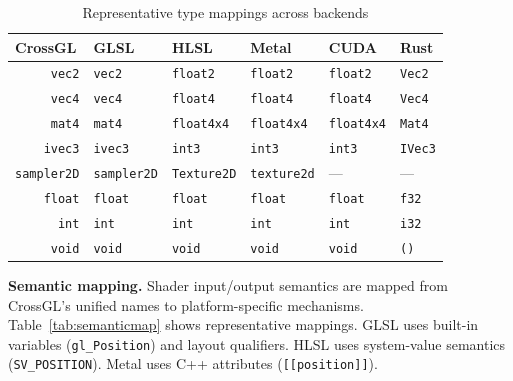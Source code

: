 \documentclass{svproc}
\begin{document}
\begin{table}
\caption{Representative type mappings across backends}
\label{tab:typemap}
\begin{center}
\begin{tabular}{r@{\quad}lllll}
\hline
\multicolumn{1}{l}{\rule{0pt}{12pt}\textbf{CrossGL}} & \textbf{GLSL} & \textbf{HLSL} & \textbf{Metal} & \textbf{CUDA} & \textbf{Rust} \\[2pt]
\hline\rule{0pt}{12pt}
\texttt{vec2} & \texttt{vec2} & \texttt{float2} & \texttt{float2} & \texttt{float2} & \texttt{Vec2} \\
\texttt{vec4} & \texttt{vec4} & \texttt{float4} & \texttt{float4} & \texttt{float4} & \texttt{Vec4} \\
\texttt{mat4} & \texttt{mat4} & \texttt{float4x4} & \texttt{float4x4} & \texttt{float4x4} & \texttt{Mat4} \\
\texttt{ivec3} & \texttt{ivec3} & \texttt{int3} & \texttt{int3} & \texttt{int3} & \texttt{IVec3} \\
\texttt{sampler2D} & \texttt{sampler2D} & \texttt{Texture2D} & \texttt{texture2d} & --- & --- \\
\texttt{float} & \texttt{float} & \texttt{float} & \texttt{float} & \texttt{float} & \texttt{f32} \\
\texttt{int} & \texttt{int} & \texttt{int} & \texttt{int} & \texttt{int} & \texttt{i32} \\
\texttt{void} & \texttt{void} & \texttt{void} & \texttt{void} & \texttt{void} & \texttt{()} \\[2pt]
\hline
\end{tabular}
\end{center}
\end{table}

\textbf{Semantic mapping.} Shader input/output semantics are mapped from CrossGL's unified names to platform-specific mechanisms. Table~\ref{tab:semanticmap} shows representative mappings. GLSL uses built-in variables (\texttt{gl\_Position}) and layout qualifiers. HLSL uses system-value semantics (\texttt{SV\_POSITION}). Metal uses C++ attributes (\texttt{[[position]]}).
\end{document}
